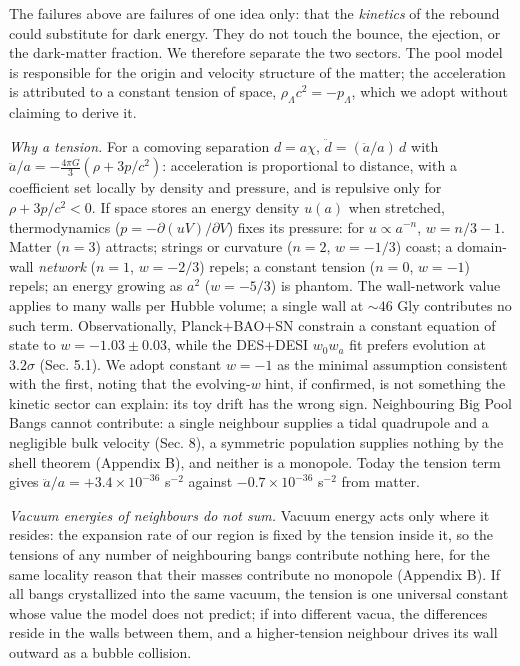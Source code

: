 \documentclass[
]{article}
\begin{document}
The failures above are failures of one idea only: that the
\emph{kinetics} of the rebound could substitute for dark energy. They do
not touch the bounce, the ejection, or the dark-matter fraction. We
therefore separate the two sectors. The pool model is responsible for
the origin and velocity structure of the matter; the acceleration is
attributed to a constant tension of space,
\(\rho_\Lambda c^2 = -p_\Lambda\), which we adopt without claiming to
derive it.

\emph{Why a tension.} For a comoving separation \(d = a\chi\),
\(\ddot d = (\ddot a/a)\,d\) with
\(\ddot a/a = -\tfrac{4\pi G}{3}(\rho + 3p/c^2)\): acceleration is
proportional to distance, with a coefficient set locally by density and
pressure, and is repulsive only for \(\rho + 3p/c^2 < 0\). If space
stores an energy density \(u(a)\) when stretched, thermodynamics
(\(p = -\partial(uV)/\partial V\)) fixes its pressure: for
\(u \propto a^{-n}\), \(w = n/3 - 1\). Matter (\(n=3\)) attracts;
strings or curvature (\(n=2\), \(w=-1/3\)) coast; a domain-wall
\emph{network} (\(n=1\), \(w=-2/3\)) repels; a constant tension
(\(n=0\), \(w=-1\)) repels; an energy growing as \(a^{2}\) (\(w=-5/3\))
is phantom. The wall-network value applies to many walls per Hubble
volume; a single wall at \(\sim\!46\) Gly contributes no such term.
Observationally, Planck+BAO+SN constrain a constant equation of state to
\(w = -1.03 \pm 0.03\), while the DES+DESI \(w_0w_a\) fit prefers
evolution at \(3.2\sigma\) (Sec. 5.1). We adopt constant \(w=-1\) as the
minimal assumption consistent with the first, noting that the
evolving-\(w\) hint, if confirmed, is not something the kinetic sector
can explain: its toy drift has the wrong sign. Neighbouring Big Pool
Bangs cannot contribute: a single neighbour supplies a tidal quadrupole
and a negligible bulk velocity (Sec. 8), a symmetric population supplies
nothing by the shell theorem (Appendix B), and neither is a monopole.
Today the tension term gives \(\ddot a/a = +3.4\times10^{-36}\)
s\(^{-2}\) against \(-0.7\times10^{-36}\) s\(^{-2}\) from matter.

\emph{Vacuum energies of neighbours do not sum.} Vacuum energy acts only
where it resides: the expansion rate of our region is fixed by the
tension inside it, so the tensions of any number of neighbouring bangs
contribute nothing here, for the same locality reason that their masses
contribute no monopole (Appendix B). If all bangs crystallized into the
same vacuum, the tension is one universal constant whose value the model
does not predict; if into different vacua, the differences reside in the
walls between them, and a higher-tension neighbour drives its wall
outward as a bubble collision.
\end{document}
